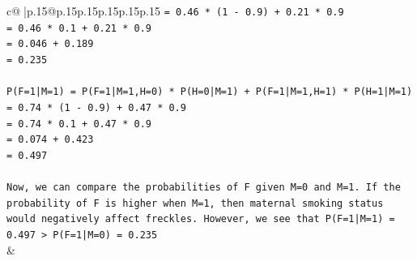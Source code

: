 \documentclass{article}
\begin{document}
{\begin{supertabular}{c@{$\;$}|p{.15\linewidth}@{}p{.15\linewidth}p{.15\linewidth}p{.15\linewidth}p{.15\linewidth}p{.15\linewidth}}
{{{\texttt{= 0.46 * (1 {-} 0.9) + 0.21 * 0.9} \\
\texttt{= 0.46 * 0.1 + 0.21 * 0.9} \\
\texttt{= 0.046 + 0.189} \\
\texttt{= 0.235} \\
\\ 
\texttt{P(F=1|M=1) = P(F=1|M=1,H=0) * P(H=0|M=1) + P(F=1|M=1,H=1) * P(H=1|M=1)} \\
\texttt{= 0.74 * (1 {-} 0.9) + 0.47 * 0.9} \\
\texttt{= 0.74 * 0.1 + 0.47 * 0.9} \\
\texttt{= 0.074 + 0.423} \\
\texttt{= 0.497} \\
\\ 
\texttt{Now, we can compare the probabilities of F given M=0 and M=1. If the probability of F is higher when M=1, then maternal smoking status would negatively affect freckles. However, we see that P(F=1|M=1) = 0.497 > P(F=1|M=0) = 0.235} \\
            }
        }
    }
    & \\ \\


\end{supertabular}}
\end{document}
